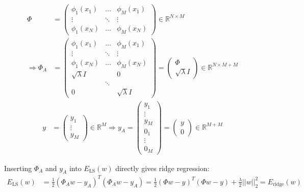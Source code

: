 \begin{align*}
\Phi &= 
\begin{pmatrix}
  \phi_1(x_1) & \ldots & \phi_M(x_1) \\
  \vdots & \ddots & \vdots \\
  \phi_1(x_N) & \ldots & \phi_M(x_N)
\end{pmatrix} \in \mathbb{R}^{N \times M} \\
\Rightarrow \Phi_A &=
\begin{pmatrix}
  \phi_1(x_1) & \ldots & \phi_M(x_1) \\
  \vdots & \ddots & \vdots \\
  \phi_1(x_N) & \ldots & \phi_M(x_N) \\
  \sqrt{\lambda} I & & 0 \\
  & \ddots & \\
  0 & & \sqrt{\lambda} I
\end{pmatrix} =
\begin{pmatrix} \Phi \\ \sqrt{\lambda} I \end{pmatrix}
\in \mathbb{R}^{N \times M+M} 
\end{align*}
\begin{align*}
  y &= \begin{pmatrix} y_1 \\ \vdots \\ y_M \end{pmatrix}
  \in \mathbb{R}^M 
  \Rightarrow y_A = \begin{pmatrix} y_1 \\ \vdots \\ y_M \\ 0_1 \\ \vdots \\ 0_M \end{pmatrix}
  = \begin{pmatrix} y \\ 0 \end{pmatrix}
\in \mathbb{R}^{M+M}
\end{align*}
\begin{flushleft}
Inserting $\Phi_A$ and $y_A$ into $E_\text{LS}(w)$ directly gives ridge regression:
\begin{align*}
  E_\text{LS}(w) &= \frac{1}{2} (\Phi_A w - y_A)^T (\Phi_A w - y_A) = \frac{1}{2} (\Phi w - y)^T (\Phi w - y) + \frac{\lambda}{2} ||w||_2^2 = E_\text{ridge}(w) \\
\end{align*}
\end{flushleft}

